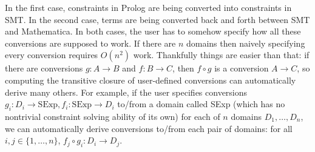 \documentclass[10pt]{article}
\begin{document}
\noindent In the first case, constraints in Prolog are being converted into
constraints in SMT. In the second case, terms are being converted back and
forth between SMT and Mathematica. In both cases, the user has to somehow
specify how all these conversions are supposed to work.
If there are $n$ domains then naively specifying every
conversion requires $O(n^2)$ work. Thankfully things are easier
than that: if there are conversions $g: A\to B$ and $f: B\to C$,
then $f\circ g$ is a conversion $A\to C$,
so computing the transitive closure of user-defined conversions
can automatically derive many others. For example, if the user
specifies conversions $g_i:D_i\to \textrm{SExp}, f_i:\textrm{SExp}\to D_i$
to/from a domain called SExp
(which has no nontrivial constraint solving ability of its own)
for each of $n$ domains $D_1,\dots,D_n$, we can automatically derive
conversions to/from each pair of domains: for all $i, j\in\{1,\dots,n\}$,
$f_j\circ g_i:D_i\to D_j$.
\end{document}
